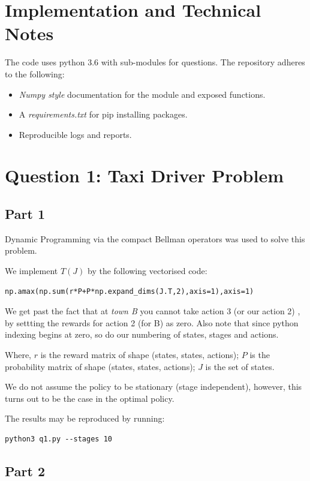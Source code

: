 \section {Implementation and Technical Notes}

The code uses python 3.6 with sub-modules for questions. The repository adheres to the following:
\begin{itemize}
\item \textit{Numpy style} documentation for the module and exposed functions. 
\item A \textit{requirements.txt }for pip installing packages.
\item  Reproducible logs and reports.
\end{itemize}

\section {Question 1: Taxi Driver Problem}

\subsection{Part 1}

Dynamic Programming via the compact Bellman operators was used to solve this problem.

We implement $T(J)$ by the following vectorised code:
\begin{lstlisting}[numbers = none]
np.amax(np.sum(r*P+P*np.expand_dims(J.T,2),axis=1),axis=1)
\end{lstlisting}

We get past the fact that at \textit{town B } you cannot take action 3 (or our action 2) , by settting the rewards for action 2 (for B) as zero. Also note that since python indexing begins at zero, so do our numbering of states, stages and actions.

Where, $r$ is the reward matrix of shape (states, states, actions);
$P$ is the probability matrix of shape (states, states, actions);
$J$ is the set of states.

We do not assume the policy to be stationary (stage independent), however, this turns out to be the case in the optimal policy.

The results may be reproduced by running:
\begin{lstlisting}[numbers = none]
python3 q1.py --stages 10
\end{lstlisting}

\subsection{Part 2}


